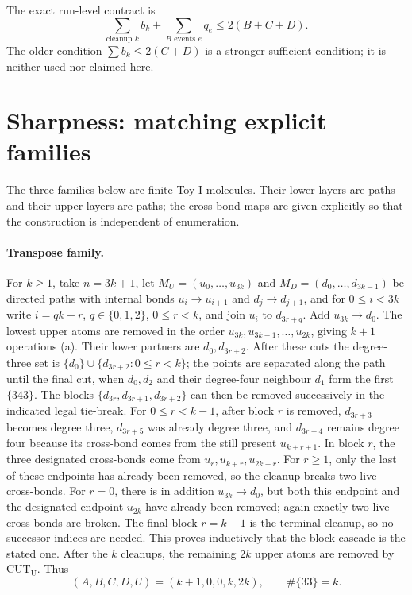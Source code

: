 \documentclass[12pt]{article}
\newcommand{\good}{\#\{33\}}
\newcommand{\MU}{M_U}
\newcommand{\MD}{M_D}
\newcommand{\CUTU}{\operatorname{CUT_U}}
\begin{document}
The exact run-level contract is
\[
 \sum_{\text{cleanup }k}b_k+\sum_{B\text{ events }e}q_e
 \le2(B+C+D).
\]
The older condition \(\sum b_k\le2(C+D)\) is a stronger sufficient condition;
it is neither used nor claimed here.

\section{Sharpness: matching explicit families}

The three families below are finite Toy I molecules.  Their lower layers are
paths and their upper layers are paths; the cross-bond maps are given explicitly
so that the construction is independent of enumeration.

\paragraph{Transpose family.}
For \(k\ge1\), take \(n=3k+1\), let \(\MU=(u_0,\ldots,u_{3k})\) and
\(\MD=(d_0,\ldots,d_{3k-1})\) be directed paths with internal bonds
\(u_i\to u_{i+1}\) and \(d_j\to d_{j+1}\), and for
\(0\le i<3k\) write \(i=qk+r\), \(q\in\{0,1,2\}\), \(0\le r<k\), and join
\(u_i\) to \(d_{3r+q}\).  Add \(u_{3k}\to d_0\).  The lowest upper atoms
are removed in the order \(u_{3k},u_{3k-1},\ldots,u_{2k}\), giving \(k+1\)
operations (a).  Their lower partners are \(d_0,d_{3r+2}\).  After these
cuts the degree-three set is \(\{d_0\}\cup\{d_{3r+2}:0\le r<k\}\); the
points are separated along the path until the final cut, when \(d_0,d_2\)
and their degree-four neighbour \(d_1\) form the first \(\{343\}\).  The
blocks \(\{d_{3r},d_{3r+1},d_{3r+2}\}\) can then be removed successively in
the indicated legal tie-break.  For \(0\le r<k-1\), after block \(r\) is
removed, \(d_{3r+3}\) becomes degree three,
\(d_{3r+5}\) was already degree three, and \(d_{3r+4}\) remains degree four
because its cross-bond comes from the still present \(u_{k+r+1}\).  In block
\(r\), the three designated cross-bonds come from
\(u_r,u_{k+r},u_{2k+r}\).  For \(r\ge1\), only the last of these endpoints
has already been removed, so the cleanup breaks two live cross-bonds.  For
\(r=0\), there is in addition \(u_{3k}\to d_0\), but both this endpoint and
the designated endpoint \(u_{2k}\) have already been removed; again exactly
two live cross-bonds are broken.  The final block \(r=k-1\) is the terminal
cleanup, so no successor indices are needed.  This proves inductively that the
block cascade is the stated one.  After the \(k\) cleanups, the remaining \(2k\)
upper atoms are removed by \(\CUTU\).  Thus
\[
 (A,B,C,D,U)=(k+1,0,0,k,2k),\qquad \good=k.
\]
\end{document}
